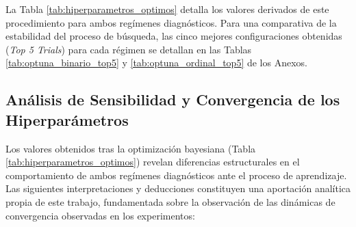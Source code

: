 \documentclass[12pt, oneside, english, spanish]{book}
\begin{document}
La Tabla \ref{tab:hiperparametros_optimos} detalla los valores derivados de este procedimiento para ambos regímenes diagnósticos. Para una comparativa de la estabilidad del proceso de búsqueda, las cinco mejores configuraciones obtenidas (\textit{Top 5 Trials}) para cada régimen se detallan en las Tablas \ref{tab:optuna_binario_top5} y \ref{tab:optuna_ordinal_top5} de los Anexos.

\begin{table}[htpb]
	\centering
	\caption[Configuración Óptima del Hiperespacio Paramétrico]{Configuración Óptima del Hiperespacio Paramétrico (Mejores \textit{Trials} de Optuna). \textbf{Fuente:} elaboración propia.}
	\label{tab:hiperparametros_optimos}
	\smallskip
\end{table}

\subsection{Análisis de Sensibilidad y Convergencia de los Hiperparámetros} \label{subsec:hpt_analisis_sensibilidad}

Los valores obtenidos tras la optimización bayesiana (Tabla \ref{tab:hiperparametros_optimos}) revelan diferencias estructurales en el comportamiento de ambos regímenes diagnósticos ante el proceso de aprendizaje. Las siguientes interpretaciones y deducciones constituyen una aportación analítica propia de este trabajo, fundamentada sobre la observación de las dinámicas de convergencia observadas en los experimentos:
\end{document}
